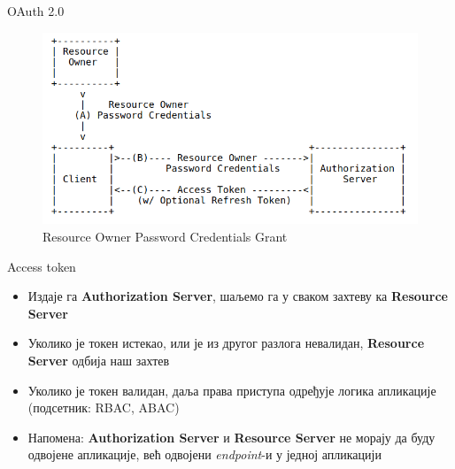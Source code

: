 \documentclass[aspectratio=169]{beamer}
\begin{document}
\begin{frame}[allowframebreaks]{OAuth 2.0}
        \framebreak
        
        \begin{figure}
            \centering
            \includegraphics[width=\textwidth,height=\textheight,keepaspectratio]{images/oauth.png}
            \caption{Resource Owner Password Credentials Grant}
            \label{fig:oauth}
        \end{figure}
    \end{frame}
    
    \begin{frame}{Access token}
        \begin{itemize}
            \item Издаје га \textbf{Authorization Server}, шаљемо га у сваком захтеву ка \textbf{Resource Server}
            \item Уколико је токен истекао, или је из другог разлога невалидан, \textbf{Resource Server} одбија наш захтев
            \item Уколико је токен валидан, даља права приступа одређује логика апликације (подсетник: RBAC, ABAC)
            \item Напомена: \textbf{Authorization Server} и \textbf{Resource Server} не морају да буду одвојене апликације, већ одвојени \textit{endpoint}-и у једној апликацији
        \end{itemize}
    \end{frame}
    
\end{document}
